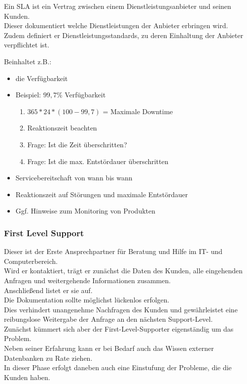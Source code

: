 \documentclass[10pt]{article}
\begin{document}
Ein SLA ist ein Vertrag zwischen einem Dienstleistungsanbieter und seinen Kunden. \\
Dieser dokumentiert welche Dienstleistungen der Anbieter erbringen wird. \\
Zudem definiert er Dienstleistungsstandards, zu deren Einhaltung der Anbieter verpflichtet ist. 

Beinhaltet z.B.:
\begin{itemize}

\item die Verfügbarkeit
\item[] Beispiel: $99,7\%$ Verfügbarkeit 
\begin{enumerate}
\item $365 * 24 * (100-99,7)$  =  Maximale Downtime
\item Reaktionszeit beachten
\item Frage: Ist die Zeit überschritten?
\item Frage: Ist die max. Entstördauer überschritten
\end{enumerate}
\item Servicebereitschaft von wann bis wann
\item Reaktionszeit auf Störungen und maximale Entstördauer
\item Ggf. Hinweise zum Monitoring von Produkten

\end{itemize}

\subsubsection{First Level Support}

Dieser ist der Erste Ansprechpartner für Beratung und Hilfe im IT- und Computerbereich. \\
Wird er kontaktiert, trägt er zunächst die Daten des Kunden, alle eingehenden Anfragen und weitergehende Informationen zusammen. \\ 
Anschließend listet er sie auf. \\
Die Dokumentation sollte möglichst lückenlos erfolgen. \\
Dies verhindert unangenehme Nachfragen des Kunden und gewährleistet eine reibungslose Weitergabe der Anfrage an den nächsten Support-Level.  \\
Zunächst kümmert sich aber der First-Level-Supporter eigenständig um das Problem. \\
Neben seiner Erfahrung kann er bei Bedarf auch das Wissen externer Datenbanken zu Rate ziehen. \\
In dieser Phase erfolgt daneben auch eine Einstufung der Probleme, die die Kunden haben.
\end{document}
